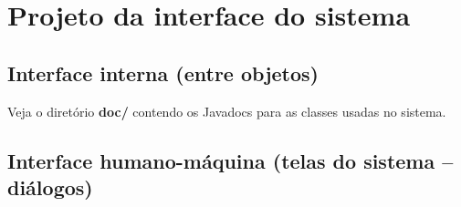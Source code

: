 \section{Projeto da interface do sistema}
\subsection{Interface interna (entre objetos)}
    Veja o diretório \textbf{doc/} contendo os Javadocs para as classes usadas no sistema.
\subsection{Interface humano-máquina (telas do sistema -- diálogos)}
